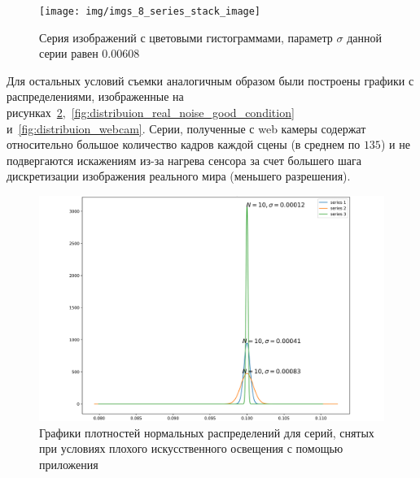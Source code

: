 \documentclass[14pt]{mmcs_article}
\begin{document}
\begin{figure}[H]
	\centering
	\texttt{[image: img/imgs\_8\_series\_stack\_image]}
	\caption{Серия изображений с цветовыми гистограммами, параметр $\sigma$ данной серии равен $0.00608$ }
	\label{fig:hists_comparision}
\end{figure}

Для остальных условий съемки аналогичным образом были построены графики с распределениями, изображенные на рисунках~\ref{fig:distribuion_real_noise},~\ref{fig:distribuion_real_noise_good_condition} и~\ref{fig:distribuion_webcam}. Серии, полученные с web камеры содержат относительно большое количество кадров каждой сцены (в среднем по $135$) и не подвергаются искажениям из-за нагрева сенсора за счет большего шага дискретизации изображения реального мира (меньшего разрешения).

\begin{figure}[H]
	\centering
	\includegraphics[scale=0.055]{img/night_condition_series_real_noise_iphone_deviation_comparison}
	\caption{Графики плотностей нормальных распределений для серий, снятых при условиях плохого искусственного освещения с помощью приложения~\autocite{RAWCamera}}
	\label{fig:distribuion_real_noise}
\end{figure}
\end{document}
